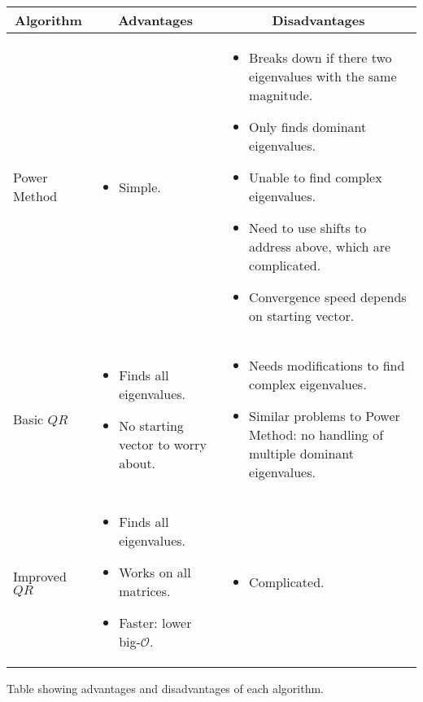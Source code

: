 \documentclass{article}
\begin{document}
\begin{center}
	\begin{tabular}{|p{0.7in}||p{2.7in}|p{3.3in}|}
		\hline
		\multicolumn{1}{|c||}{Algorithm} &
		\multicolumn{1}{c|}{Advantages} &
		\multicolumn{1}{c|}{Disadvantages} \\
		\hline
		\hline
		\vspace{\topsep}\centering Power Method &
		\begin{itemize}
			\item Simple.
		\end{itemize} &
		\begin{itemize}
			\item Breaks down if there two eigenvalues with the same magnitude.
			\item Only finds dominant eigenvalues.
			\item Unable to find complex eigenvalues.
			\item Need to use shifts to address above, which are complicated.
			\item Convergence speed depends on starting vector.
		\end{itemize} \\
		\hline
		\vspace{\topsep}\centering Basic $QR$ &
		\begin{itemize}
			\item Finds all eigenvalues.
			\item No starting vector to worry about.
		\end{itemize} &
		\begin{itemize}
			\item Needs modifications to find complex eigenvalues.
			\item Similar problems to Power Method: no handling of multiple dominant eigenvalues.
		\end{itemize} \\
		\hline
		\vspace{\topsep}\centering Improved $QR$ &
		\begin{itemize}
			\item Finds all eigenvalues.
			\item Works on all matrices.
			\item Faster: lower big-$\mathcal O$.
		\end{itemize} &
		\begin{itemize}
			\item Complicated.
		\end{itemize} \\
		\hline
	\end{tabular}

	Table showing advantages and disadvantages of each algorithm.
\end{center}
\end{document}
